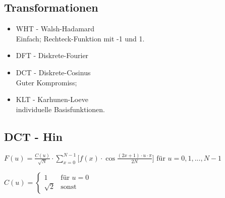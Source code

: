\begin{multicols}{2}

\subsection*{Transformationen}
\begin{minipage}{\columnwidth}
\begin{itemize}
	\setlength{\parskip}{0pt}
	\setlength{\itemsep}{0pt}
	\item WHT - Walsh-Hadamard\\
			Einfach; Rechteck-Funktion mit -1 und 1.
	\item DFT - Diskrete-Fourier
	\item DCT - Diskrete-Cosinus\\
			Guter Kompromiss; 
	\item KLT - Karhunen-Loeve\\
			individuelle Basisfunktionen.
\end{itemize}
\end{minipage}

\end{multicols}

\subsection*{DCT - Hin}
$\displaystyle F(u) = \frac{C(u)}{\sqrt{N}}
	\cdot \sum_{x=0}^{N-1} \bigg[ f(x)
	\cdot \cos{\frac{(2x+1) \cdot u \cdot \pi{}}{2N}}
	\bigg] \mbox{  für } u=0,1,...,N-1 $
	
$\displaystyle C(u) = \begin{cases}1&\text{für }
	u=0\\\sqrt{2}&\text{sonst}\end{cases} $
